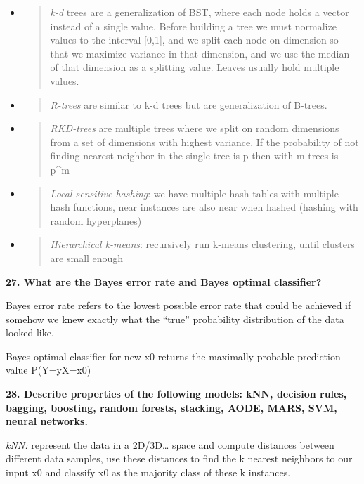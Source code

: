 \begin{itemize}
\item
  \begin{quote}
  \textit{k-d} trees are a generalization of BST, where each node
  holds a vector instead of a single value. Before building a tree we
  must normalize values to the interval {[}0,1{]}, and we split each
  node on dimension so that we maximize variance in that dimension, and
  we use the median of that dimension as a splitting value. Leaves
  usually hold multiple values.
  \end{quote}
\item
  \begin{quote}
  \textit{R-trees} are similar to k-d trees but are generalization of
  B-trees.
  \end{quote}
\item
  \begin{quote}
  \textit{RKD-trees} are multiple trees where we split on random
  dimensions from a set of dimensions with highest variance. If the
  probability of not finding nearest neighbor in the single tree is p
  then with m trees is p\^{}m
  \end{quote}
\item
  \begin{quote}
  \textit{Local sensitive hashing}: we have multiple hash tables with
  multiple hash functions, near instances are also near when hashed
  (hashing with random hyperplanes)
  \end{quote}
\item
  \begin{quote}
  \textit{Hierarchical k-means}: recursively run k-means clustering,
  until clusters are small enough
  \end{quote}
\end{itemize}

\textbf{27. What are the Bayes error rate and Bayes optimal classifier?}

Bayes error rate refers to the lowest possible error rate that could be
achieved if somehow we knew exactly what the ``true'' probability
distribution of the data looked like.

Bayes optimal classifier for new x0 returns the maximally probable
prediction value P(Y=y\textbar X=x0)

\textbf{28. Describe properties of the following models: kNN, decision
rules, bagging, boosting, random forests, stacking, AODE, MARS, SVM,
neural networks.}

\textit{kNN:} represent the data in a 2D/3D\ldots{} space and compute
distances between different data samples, use these distances to find
the k nearest neighbors to our input x0 and classify x0 as the majority
class of these k instances.

